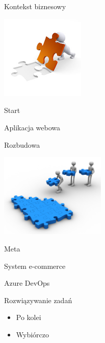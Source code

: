 \documentclass{beamer}
\begin{document}
\begin{frame}{Kontekst biznesowy}
	\begin{center}
		\includegraphics[height=4cm]{business.jpg}
	\end{center}
\end{frame}

\begin{frame}{Start}
	\begin{center}
		\Huge{Aplikacja webowa}
	\end{center}
\end{frame}

\begin{frame}{Rozbudowa}
	\begin{center}
		\includegraphics[height=4cm]{develop1.jpg}
	\end{center}
\end{frame}

\begin{frame}{Meta}
	\begin{center}
		\Huge{System e-commerce}
	\end{center}
\end{frame}

\begin{frame}{}
	\begin{center}
		\Huge{Azure DevOps}
	\end{center}
\end{frame}

\begin{frame}{Rozwiązywanie zadań}
	\begin{huge}
		\begin{itemize}
			\item Po kolei
			\item Wybiórczo
		\end{itemize}
	\end{huge}
\end{frame}
\end{document}
